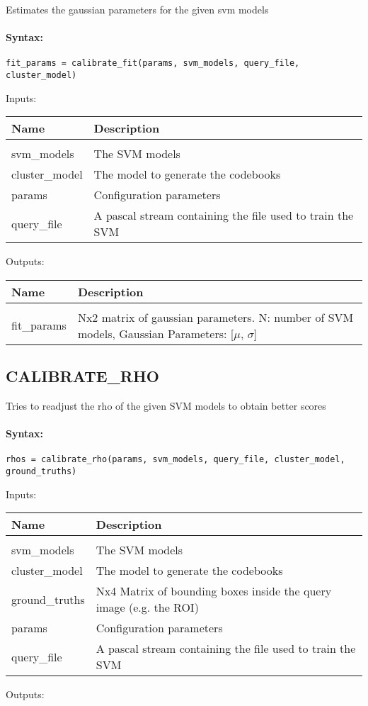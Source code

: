 Estimates the gaussian parameters for the given svm models

\paragraph{Syntax:} \verb|fit_params = calibrate_fit(params, svm_models, query_file, cluster_model)|

Inputs:

\begin{tabular}{|l|p{5cm}|}
\hline
\textbf{Name} & \textbf{Description} \\
\hline \hline \\
svm\_models & The SVM models  \\ \hline
cluster\_model & The model to generate the codebooks  \\ \hline
params & Configuration parameters  \\ \hline
query\_file & A pascal stream containing the file used to train the SVM  \\ \hline
\end{tabular}
Outputs:

\begin{tabular}{|l|p{5cm}|}
\hline
\textbf{Name} & \textbf{Description} \\
\hline \hline \\
fit\_params & Nx2 matrix of gaussian parameters. N: number of SVM models, Gaussian Parameters: [$\mu$, $\sigma$]  \\ \hline
\end{tabular}

\subsection{CALIBRATE\_RHO}

Tries to readjust the rho of the given SVM models to obtain better scores

\paragraph{Syntax:} \verb|rhos = calibrate_rho(params, svm_models, query_file, cluster_model, ground_truths)|

Inputs:

\begin{tabular}{|l|p{5cm}|}
\hline
\textbf{Name} & \textbf{Description} \\
\hline \hline \\
svm\_models & The SVM models  \\ \hline
cluster\_model & The model to generate the codebooks  \\ \hline
ground\_truths & Nx4 Matrix of bounding boxes inside the query image (e.g. the ROI)  \\ \hline
params & Configuration parameters  \\ \hline
query\_file & A pascal stream containing the file used to train the SVM  \\ \hline
\end{tabular}
Outputs:

